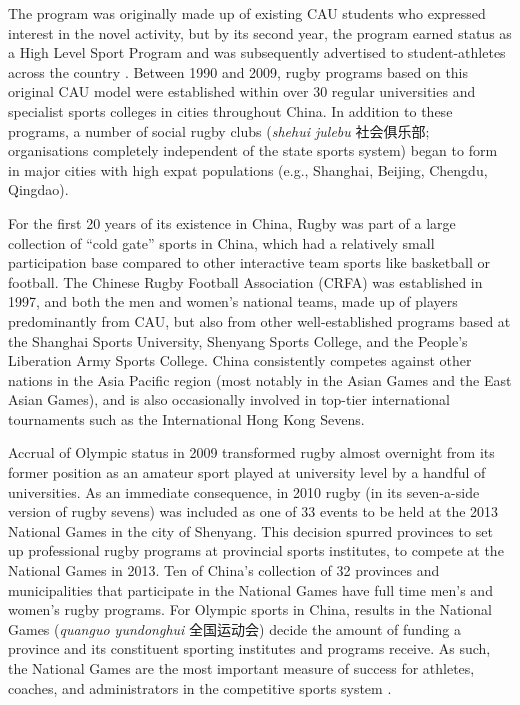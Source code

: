 \begin{CJK}{UTF8}{gbsn}
 The program was originally made up of existing CAU students who expressed interest in the novel activity, but by its second year, the program earned status as a High Level Sport Program and was subsequently advertised to student-athletes across the country \citep[2]{Xu2010}.  Between 1990 and 2009, rugby programs based on this original CAU model were established within over 30 regular universities and specialist sports colleges in cities throughout China.  In addition to these programs, a number of social rugby clubs (\textit{shehui julebu} 社会俱乐部; organisations completely independent of the state sports system) began to form in major cities with high expat populations (e.g., Shanghai, Beijing, Chengdu, Qingdao).

 For the first 20 years of its existence in China, Rugby was part of a large collection of ``cold gate'' sports in China, which had a relatively small participation base compared to other interactive team sports like basketball or football.  The Chinese Rugby Football Association (CRFA) was established in 1997, and both the men and women's national teams, made up of players predominantly from CAU, but also from other well-established programs based at the Shanghai Sports University, Shenyang Sports College, and the People's Liberation Army Sports College. China consistently competes against other nations in the Asia Pacific region (most notably in the Asian Games and the East Asian Games), and is also occasionally involved in top-tier international tournaments such as the International Hong Kong Sevens.

 Accrual of Olympic status in 2009 transformed rugby almost overnight from its former position as an amateur sport played at university level by a handful of universities.  As an immediate consequence, in 2010 rugby (in its seven-a-side version of rugby sevens) was included as one of 33 events to be held at the 2013 National Games in the city of Shenyang.  This decision spurred provinces to set up professional rugby programs at provincial sports institutes, to compete at the National Games in 2013.  Ten of China's collection of 32 provinces and municipalities that participate in the National Games have full time men's and women's rugby programs.  For Olympic sports in China, results in the National Games (\textit{quanguo yundonghui} 全国运动会) decide the amount of funding a province and its constituent sporting institutes and programs receive.  As such, the National Games are the most important measure of success for athletes, coaches, and administrators in the competitive sports system \citep{Hong2002}.


\end{CJK}

